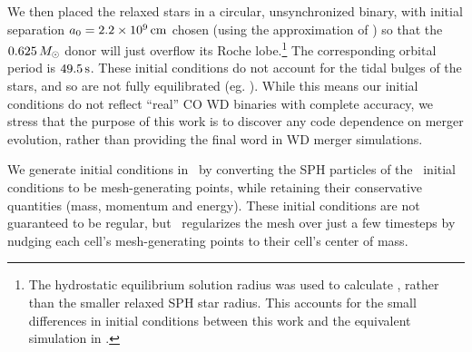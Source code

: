 We then placed the relaxed stars in a circular, unsynchronized binary, with initial separation $\azero = 2.2\times10^9\,\mrm{cm}$ chosen (using the approximation of \citealt{eggl83}) so that the $0.625\,\Msun$ donor will just overflow its Roche lobe.\footnote{The hydrostatic equilibrium solution radius was used to calculate \azero, rather than the smaller relaxed SPH star radius.  This accounts for the small differences in initial conditions between this work and the equivalent simulation in \citeal{zhu+13}.}  The corresponding orbital period is $49.5\,\mathrm{s}$.  These initial conditions do not account for the tidal bulges of the stars, and so are not fully equilibrated (eg. \citealt{dan+11}).  While this means our initial conditions do not reflect ``real'' CO WD binaries with complete accuracy, we stress that the purpose of this work is to discover any code dependence on merger evolution, rather than providing the final word in WD merger simulations.

We generate initial conditions in \arepo\ by converting the SPH particles of the \gasoline\ initial conditions to be mesh-generating points, while retaining their conservative quantities (mass, momentum and energy).  These initial conditions are not guaranteed to be regular, but \arepo\ regularizes the mesh over just a few timesteps by nudging each cell's mesh-generating points to their cell's center of mass.  


